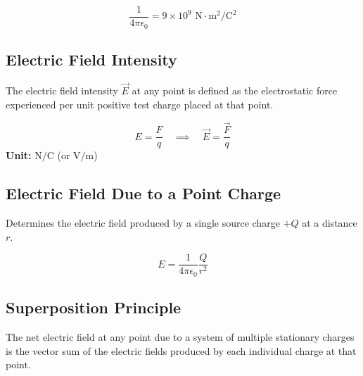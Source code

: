 \documentclass[11pt,a4paper]{article}
\begin{document}
\begin{formulabox}
    \[ \frac{1}{4\pi\epsilon_0} = 9 \times 10^9 \text{ N}\cdot\text{m}^2/\text{C}^2 \]
\end{formulabox}

\subsection{Electric Field Intensity}
The electric field intensity $\vec{E}$ at any point is defined as the electrostatic force experienced per unit positive test charge placed at that point.

\begin{formulabox}
    \[ E = \frac{F}{q} \quad \implies \quad \vec{E} = \frac{\vec{F}}{q} \]
    \textbf{Unit:} $\text{N/C}$ (or $\text{V/m}$)
\end{formulabox}

\subsection{Electric Field Due to a Point Charge}
Determines the electric field produced by a single source charge $+Q$ at a distance $r$.

\begin{center}
\end{center}

\begin{formulabox}
    \[ E = \frac{1}{4\pi\epsilon_0} \frac{Q}{r^2} \]
\end{formulabox}

\subsection{Superposition Principle}
The net electric field at any point due to a system of multiple stationary charges is the vector sum of the electric fields produced by each individual charge at that point.
\end{document}
